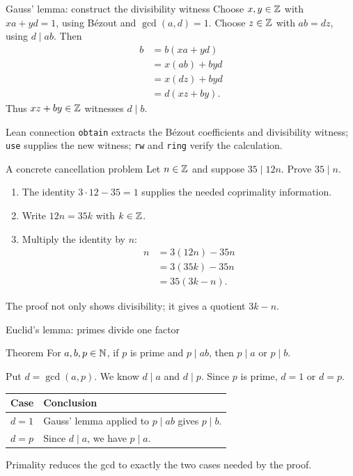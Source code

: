 \begin{frame}{Gauss' lemma: construct the divisibility witness}
Choose $x,y\in\mathbb{Z}$ with $xa+yd=1$, using B\'ezout and $\gcd(a,d)=1$.
Choose $z\in\mathbb{Z}$ with $ab=dz$, using $d\mid ab$.
Then
\[
\begin{aligned}
b&=b(xa+yd)\\
 &=x(ab)+byd\\
 &=x(dz)+byd\\
 &=d(xz+by).
\end{aligned}
\]
Thus $xz+by\in\mathbb{Z}$ witnesses $d\mid b$.
\begin{block}{Lean connection}
\texttt{obtain} extracts the B\'ezout coefficients and divisibility witness; \texttt{use} supplies the new witness; \texttt{rw} and \texttt{ring} verify the calculation.
\end{block}
\end{frame}

\begin{frame}{A concrete cancellation problem}
Let $n\in\mathbb{Z}$ and suppose $35\mid12n$. Prove $35\mid n$.
\begin{enumerate}
\item The identity $3\cdot12-35=1$ supplies the needed coprimality information.
\item Write $12n=35k$ with $k\in\mathbb{Z}$.
\item Multiply the identity by $n$:
\[
\begin{aligned}
n&=3(12n)-35n\\
 &=3(35k)-35n\\
 &=35(3k-n).
\end{aligned}
\]
\end{enumerate}
The proof not only shows divisibility; it gives a quotient $3k-n$.
\end{frame}

\begin{frame}{Euclid's lemma: primes divide one factor}
\begin{block}{Theorem}
For $a,b,p\in\mathbb{N}$, if $p$ is prime and $p\mid ab$, then $p\mid a$ or $p\mid b$.
\end{block}
Put $d=\gcd(a,p)$. We know $d\mid a$ and $d\mid p$.
Since $p$ is prime, $d=1$ or $d=p$.
\begin{center}
\begin{tabular}{ll}
\toprule
Case & Conclusion\\\midrule
$d=1$ & Gauss' lemma applied to $p\mid ab$ gives $p\mid b$.\\[2mm]
$d=p$ & Since $d\mid a$, we have $p\mid a$.\\\bottomrule
\end{tabular}
\end{center}
Primality reduces the gcd to exactly the two cases needed by the proof.
\end{frame}

